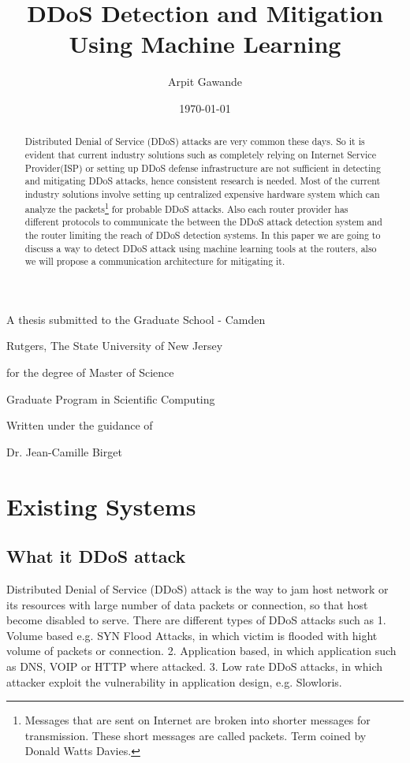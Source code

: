 \documentclass[10pt,oneside,a4paper]{article}
\title{DDoS Detection and Mitigation Using Machine Learning}
\author{Arpit Gawande}
\date{\today}
\begin{document}
\maketitle


\begin{center}
\vfill
A thesis submitted to the Graduate School - Camden \par
Rutgers, The State University of New Jersey \par
\vspace{1cm}
for the degree of Master of Science \par
\vspace{1cm}
Graduate Program in Scientific Computing \par
\vspace{1cm}
Written under the guidance of \par
Dr. Jean-Camille Birget
\vfill
\end{center}

\pagebreak

\tableofcontents
\newpage

\begin{abstract}
Distributed Denial of Service (DDoS) attacks are very common these days\cite{ddos-attack-news}. So it is evident that current industry solutions such as completely relying on Internet Service Provider(ISP) or setting up DDoS defense infrastructure are not sufficient in detecting and mitigating DDoS attacks, hence consistent research is needed. Most of the current industry solutions involve setting up centralized expensive hardware system which can analyze the packets\footnote{Messages that are sent on Internet are broken into shorter messages for transmission. These short messages are called packets. Term coined by Donald Watts Davies.} \cite{network-data-packet} for probable DDoS attacks. Also each router provider has different protocols to communicate the between the DDoS attack detection system and the router limiting the reach of DDoS detection systems. In this paper we are going to discuss a way to detect DDoS attack using machine learning tools at the routers, also we will propose a communication architecture for mitigating it.
\end{abstract}

\section{Existing Systems}

\subsection{What it DDoS attack}
Distributed Denial of Service (DDoS) attack is the way to jam host network or its resources with large number of data packets or connection, so that host become disabled to serve. There are different types of DDoS attacks such as
1. Volume based e.g. SYN Flood Attacks, in which victim is flooded with hight volume of packets or connection.
2. Application based, in which application such as DNS, VOIP or HTTP where attacked.
3. Low rate DDoS attacks, in which attacker exploit the vulnerability in application design, e.g. Slowloris.
\cite{DDoS-attacks}
\end{document}

